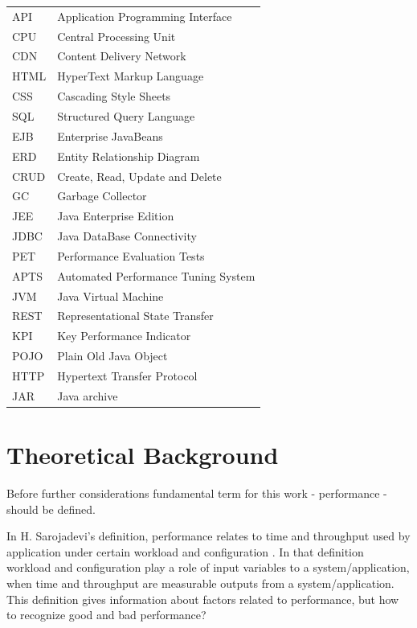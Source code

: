 \documentclass[12pt,a4paper]{article}
\begin{document}
\def\arraystretch{1.5}
\begin{tabularx}{\textwidth}{p{1.5cm}X}
API & Application Programming Interface\\ 
CPU & Central Processing Unit\\ 
CDN & Content Delivery Network\\
HTML & HyperText Markup Language\\ 
CSS & Cascading Style Sheets\\ 
SQL & Structured Query Language\\ 
EJB & Enterprise JavaBeans\\ 
ERD & Entity Relationship Diagram\\ 
CRUD & Create, Read, Update and Delete\\ 
GC & Garbage Collector\\ 
JEE & Java Enterprise Edition\\
JDBC & Java DataBase Connectivity\\ 
PET & Performance Evaluation Tests \\ 
APTS & Automated Performance Tuning System \\ 
JVM & Java Virtual Machine\\ 
REST & Representational State Transfer \\ 
KPI & Key Performance Indicator\\
POJO & Plain Old Java Object\\
HTTP & Hypertext Transfer Protocol\\ 
JAR & Java archive\\
\end{tabularx}

\pagebreak

\section{Theoretical Background} \label{section:theoreticalbackground}
Before further considerations fundamental term for this work - performance -  should be defined. 

In H. Sarojadevi's definition, performance relates to time and throughput used by application under certain workload and configuration \cite{petmethodsandtools}. In that definition workload and configuration play a role of input variables to a system/application, when time and throughput are measurable outputs from a system/application. This definition gives information about factors related to performance, but how to recognize good and bad performance?
\end{document}

